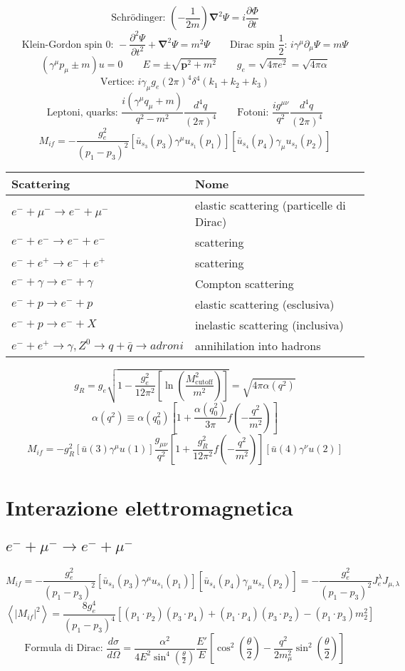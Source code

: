 \documentclass[10pt, onecolumn, a4paper]{article}
\def\bb{\mathbf}
\def\grad{\nabla}
\def\cutoff{\textrm{cutoff}}
\def\({\left(}
\def\){\right)}
\def\[{\left[}
\def\]{\right]}
\begin{document}
$$\textrm{Schrödinger: }\(-\frac{1}{2m}\)\bb{\grad}^2\Psi=i\frac{\partial\Phi}{\partial t}$$
$$\textrm{Klein-Gordon spin 0: }-\frac{\partial^2\Psi}{\partial t^2}+\bb{\grad}^2\Psi=m^2\Psi \qquad \textrm{Dirac spin }\frac{1}{2}\textrm{: } i\gamma^{\mu}\partial_{\mu}\Psi=m\Psi$$
$$\(\gamma^{\mu}p_{\mu}\pm m\)u=0 \qquad E=\pm\sqrt{\bb{p}^2+m^2} \qquad g_e=\sqrt{4\pi e^2}=\sqrt{4\pi\alpha}$$
$$\textrm{Vertice: } i\gamma_{\mu}g_e\(2\pi\)^4\delta^4\(k_1+k_2+k_3\)$$
$$\textrm{Leptoni, quarks: } \frac{i\(\gamma^{\mu}q_{\mu}+m\)}{q^2-m^2}\frac{d^4q}{\(2\pi\)^4} \qquad \textrm{Fotoni: } \frac{ig^{\mu\nu}}{q^2}\frac{d^4q}{\(2\pi\)^4}$$
$$M_{if}=-\frac{g_e^2}{\(p_1-p_3\)^2}\[\bar u_{s_{3}}\(p_3\)\gamma^{\mu}u_{s_{1}}\(p_1\)\]\[\bar u_{s_{4}}\(p_4\)\gamma_{\mu}u_{s_{2}}\(p_2\)\]$$
\begin{center}
\begin{tabularx}{\textwidth}{X | l}
\toprule
Scattering & Nome \\
\midrule
$e^-+\mu^-\to e^-+\mu^-$ & elastic scattering (particelle di Dirac) \\
$e^-+e^-\to e^-+e^-$ & scattering \\
$e^-+e^+\to e^-+e^+$ & scattering \\
$e^-+\gamma\to e^-+\gamma$ & Compton scattering \\
$e^-+p\to e^-+p$ & elastic scattering (esclusiva) \\
$e^-+p\to e^-+X$ & inelastic scattering (inclusiva) \\
$e^-+e^+\to \gamma,Z^0\to q+\bar q\to adroni$ & annihilation into hadrons \\
\bottomrule
\end{tabularx}
\end{center}
$$g_R=g_e\sqrt{1-\frac{g_e^2}{12\pi^2}\[\ln{\(\frac{M^2_{\cutoff}}{m^2}\)}\]}=\sqrt{4\pi\alpha\(q^2\)}$$
$$\alpha\(q^2\)\equiv\alpha\(q_0^2\)\[1+\frac{\alpha\(q_0^2\)}{3\pi}f\(-\frac{q^2}{m^2}\)\]$$
$$M_{if}=-g_R^2\[\bar u\(3\)\gamma^{\mu}u\(1\)\]\frac{g_{\mu\nu}}{q^2}\[1+\frac{g_R^2}{12\pi^2}f\(-\frac{q^2}{m^2}\)\]\[\bar u\(4\)\gamma^{\nu}u\(2\)\]$$

\section{Interazione elettromagnetica} %
\subsection{$e^-+\mu^-\to e^-+\mu^-$} %
$$M_{if}=-\frac{g_e^2}{\(p_1-p_3\)^2}\[\bar u_{s_{3}}\(p_3\)\gamma^{\mu}u_{s_{1}}\(p_1\)\]\[\bar u_{s_{4}}\(p_4\)\gamma_{\mu}u_{s_{2}}\(p_2\)\]=-\frac{g_e^2}{\(p_1-p_3\)^2}J_e^{\lambda}J_{\mu,\lambda}$$
$$\left<|M_{if}|^2\right>=\frac{8g_e^4}{\(p_1-p_3\)^4}\[\(p_1\cdot p_2\)\(p_3\cdot p_4\)+\(p_1\cdot p_4\)\(p_3\cdot p_2\)-\(p_1\cdot p_3\)m_2^2\]$$
$$\textrm{Formula di Dirac: } \frac{d\sigma}{d\Omega}=\frac{\alpha^2}{4E^2\sin^4{\(\frac{\theta}{2}\)}}\frac{E'}{E}\[\cos^2{\(\frac{\theta}{2}\)}-\frac{q^2}{2m_{\mu}^2}\sin^2{\(\frac{\theta}{2}\)}\]$$
\end{document}
